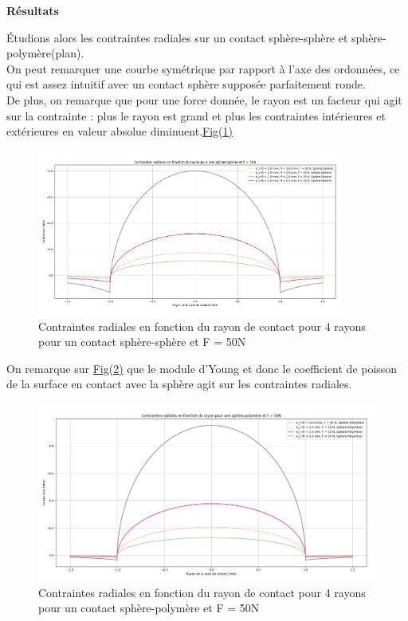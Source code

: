 \documentclass[a4paper,12pt]{article}
\begin{document}
\begin{center}
	\textbf{Résultats}
\end{center}
Étudions alors les contraintes radiales sur un contact sphère-sphère et sphère-polymère(plan).
\bigskip
\\
On peut remarquer une courbe symétrique par rapport à l'axe des ordonnées, ce qui est assez intuitif avec un contact sphère supposée parfaitement ronde.\\
De plus, on remarque que pour une force donnée, le rayon est un facteur qui agit sur la contrainte : plus le rayon est grand et plus les contraintes intérieures et extérieures en valeur absolue diminuent.\hyperref[fig:mon_image1]{Fig(1)}
\begin{figure}[H] %
	\centering
	\includegraphics[width=0.9\textwidth]{rad1.png} %
	\caption{Contraintes radiales en fonction du rayon de contact pour 4 rayons pour un contact sphère-sphère et F = 50N} %
	\label{fig:mon_image1} %
\end{figure}
On remarque sur \hyperref[fig:mon_image2]{Fig(2)} que le module d'Young et donc le coefficient de poisson de la surface en contact avec la sphère agit sur les contraintes radiales.
\begin{figure}[H] %
	\centering
	\includegraphics[width=1\textwidth]{rad2.png} %
	\caption{Contraintes radiales en fonction du rayon de contact pour 4 rayons pour un contact sphère-polymère et F = 50N} %
	\label{fig:mon_image2} %
\end{figure}
\end{document}
